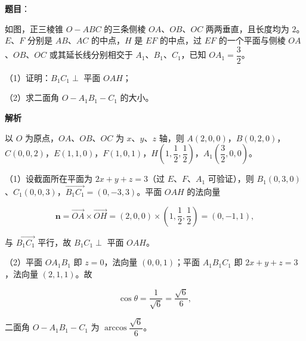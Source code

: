 \begin{answer}

\textbf{题目}：

如图，正三棱锥 $O-ABC$ 的三条侧棱 $OA$、$OB$、$OC$ 两两垂直，且长度均为 $2$。$E$、$F$ 分别是 $AB$、$AC$ 的中点，$H$ 是 $EF$ 的中点，过 $EF$ 的一个平面与侧棱 $OA$、$OB$、$OC$ 或其延长线分别相交于 $A_1$、$B_1$、$C_1$，已知 $OA_1=\dfrac32$。

（1）证明：$B_1C_1\perp$ 平面 $OAH$；

（2）求二面角 $O-A_1B_1-C_1$ 的大小。
\nopagebreak[4]
\begin{center}\end{center}
\nopagebreak[4]
\textbf{解析}

以 $O$ 为原点，$OA$、$OB$、$OC$ 为 $x$、$y$、$z$ 轴，则 $A(2,0,0)$，$B(0,2,0)$，$C(0,0,2)$，$E(1,1,0)$，$F(1,0,1)$，$H\left(1,\dfrac12,\dfrac12\right)$，$A_1\left(\dfrac32,0,0\right)$。

（1）设截面所在平面为 $2x+y+z=3$（过 $E$、$F$、$A_1$ 可验证），则 $B_1(0,3,0)$、$C_1(0,0,3)$，$\overrightarrow{B_1C_1}=(0,-3,3)$。平面 $OAH$ 的法向量

\nopagebreak[4]
\[\boldsymbol n=\overrightarrow{OA}\times\overrightarrow{OH}=(2,0,0)\times\left(1,\frac12,\frac12\right)=(0,-1,1),\]

与 $\overrightarrow{B_1C_1}$ 平行，故 $B_1C_1\perp$ 平面 $OAH$。

（2）平面 $OA_1B_1$ 即 $z=0$，法向量 $(0,0,1)$；平面 $A_1B_1C_1$ 即 $2x+y+z=3$，法向量 $(2,1,1)$。故

\nopagebreak[4]
\[\cos\theta=\frac{1}{\sqrt6}=\frac{\sqrt6}6,\]

二面角 $O-A_1B_1-C_1$ 为 $\arccos\dfrac{\sqrt6}6$。


\end{answer}
